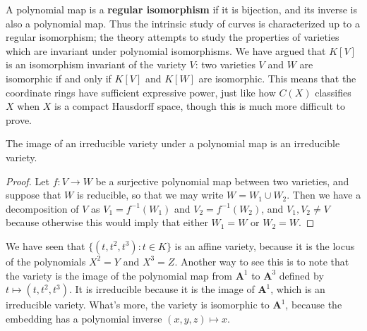 A polynomial map is a {\bf regular isomorphism} if it is bijection, and its inverse is also a polynomial map. Thus the intrinsic study of curves is characterized up to a regular isomorphism; the theory attempts to study the properties of varieties which are invariant under polynomial isomorphisms. We have argued that $K[V]$ is an isomorphism invariant of the variety $V$: two varieties $V$ and $W$ are isomorphic if and only if $K[V]$ and $K[W]$ are isomorphic. This means that the coordinate rings have sufficient expressive power, just like how $C(X)$ classifies $X$ when $X$ is a compact Hausdorff space, though this is much more difficult to prove.

\begin{prop}
    The image of an irreducible variety under a polynomial map is an irreducible variety.
\end{prop}
\begin{proof}
    Let $f: V \to W$ be a surjective polynomial map between two varieties, and suppose that $W$ is reducible, so that we may write $W = W_1 \cup W_2$. Then we have a decomposition of $V$ as $V_1 = f^{-1}(W_1)$ and $V_2 = f^{-1}(W_2)$, and $V_1, V_2 \neq V$ because otherwise this would imply that either $W_1 = W$ or $W_2 = W$.
\end{proof}

\begin{example}
    We have seen that $\{ (t,t^2,t^3): t \in K \}$ is an affine variety, because it is the locus of the polynomials $X^2 = Y$ and $X^3 = Z$. Another way to see this is to note that the variety is the image of the polynomial map from $\mathbf{A}^1$ to $\mathbf{A}^3$ defined by $t \mapsto (t,t^2,t^3)$. It is irreducible because it is the image of $\mathbf{A}^1$, which is an irreducible variety. What's more, the variety is isomorphic to $\mathbf{A}^1$, because the embedding has a polynomial inverse $(x,y,z) \mapsto x$.
\end{example}

